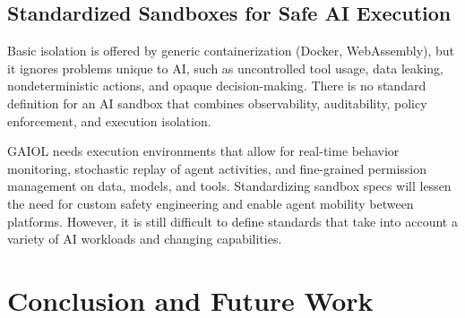 \documentclass[final,5p,times,twocolumn,authoryear,draft]{elsarticle}
\begin{document}

\subsection{Standardized Sandboxes for Safe AI Execution}

Basic isolation is offered by generic containerization (Docker, WebAssembly), but it ignores problems unique to AI, such as uncontrolled tool usage, data leaking, nondeterministic actions, and opaque decision-making. There is no standard definition for an AI sandbox that combines observability, auditability, policy enforcement, and execution isolation.

GAIOL needs execution environments that allow for real-time behavior monitoring, stochastic replay of agent activities, and fine-grained permission management on data, models, and tools. Standardizing sandbox specs will lessen the need for custom safety engineering and enable agent mobility between platforms. However, it is still difficult to define standards that take into account a variety of AI workloads and changing capabilities.



\section{Conclusion and Future Work}
\end{document}

